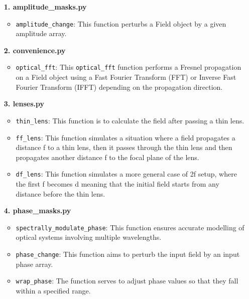 \documentclass[a4paper,12pt]{report}
\begin{document}
\begin{itemize}[itemsep=1em, left=0pt]
    \item[\large\bfseries 1. amplitude\_masks.py]
      \begin{itemize}[itemsep=0.5em]
        \item \texttt{amplitude\_change}: This function perturbs a Field object by a given amplitude array.
      \end{itemize}
  
    \item[\large\bfseries 2. convenience.py]
      \begin{itemize}[itemsep=0.5em]
        \item \texttt{optical\_fft}: This \texttt{optical\_fft} function performs a Fresnel propagation on a Field object using a Fast Fourier Transform (FFT) or Inverse Fast Fourier Transform (IFFT) depending on the propagation direction.
      \end{itemize}
  
    \item[\large\bfseries 3. lenses.py]
      \begin{itemize}[itemsep=0.5em]
        \item \texttt{thin\_lens}: This function is to calculate the field after passing a thin lens.
        \item \texttt{ff\_lens}: This function simulates a situation where a field propagates a distance f to a thin lens, then it passes through the thin lens and then propagates another distance f to the focal plane of the lens.
        \item \texttt{df\_lens}: This function simulates a more general case of 2f setup, where the first f becomes d meaning that the initial field starts from any distance before the thin lens.
      \end{itemize}
  
    \item[\large\bfseries 4. phase\_masks.py]
      \begin{itemize}[itemsep=0.5em]
        \item \texttt{spectrally\_modulate\_phase}: This function ensures accurate modelling of optical systems involving multiple wavelengths.
        \item \texttt{phase\_change}: This function aims to perturb the input field by an input phase array.
        \item \texttt{wrap\_phase}: The function serves to adjust phase values so that they fall within a specified range.
      \end{itemize}
  

\end{itemize}
\end{document}
